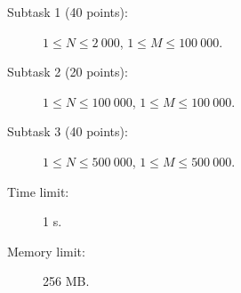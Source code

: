 \documentclass{boi2014-lt}
\begin{document}
    \Scoring

    \begin{description}
        \item[Subtask 1 (40 points):] $1 \le N \le 2\ 000$, $1 \le M \le 100\ 000$.
        \item[Subtask 2 (20 points):] $1 \le N \le 100\ 000$, $1 \le M \le 100\ 000$.
        \item[Subtask 3 (40 points):] $1 \le N \le 500\ 000$, $1 \le M \le 500\ 000$.
    \end{description}

    \Constraints

    \begin{description}
        \item[Time limit:] 1 s.
        \item[Memory limit:] 256 MB.
    \end{description}
\end{document}
